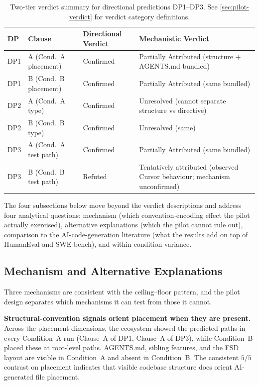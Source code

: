 \documentclass[12pt,a4paper]{report}
\begin{document}
\begin{table}[H]
\centering
\caption{Two-tier verdict summary for directional predictions DP1--DP3. See \autoref{sec:pilot-verdict} for verdict category definitions.}
\label{tab:two-tier-verdicts}
\small
\begin{tabular}{@{}lll p{5.5cm}@{}}
\toprule
\textbf{DP} & \textbf{Clause} & \textbf{Directional Verdict} & \textbf{Mechanistic Verdict} \\
\midrule
DP1 & A (Cond.~A placement) & Confirmed & Partially Attributed (structure + AGENTS.md bundled) \\
DP1 & B (Cond.~B placement) & Confirmed & Partially Attributed (same bundled) \\
DP2 & A (Cond.~A type) & Confirmed & Unresolved (cannot separate structure vs directive) \\
DP2 & B (Cond.~B type) & Confirmed & Unresolved (same) \\
DP3 & A (Cond.~A test path) & Confirmed & Partially Attributed (same bundled) \\
DP3 & B (Cond.~B test path) & Refuted & Tentatively attributed (observed Cursor behaviour; mechanism unconfirmed) \\
\bottomrule
\end{tabular}
\normalsize
\end{table}

The four subsections below move beyond the verdict descriptions and address four analytical questions: mechanism (which convention-encoding effect the pilot actually exercised), alternative explanations (which the pilot cannot rule out), comparison to the AI-code-generation literature (what the results add on top of HumanEval and SWE-bench), and within-condition variance.

\subsection{Mechanism and Alternative Explanations}
\label{sec:mechanism-and-alternatives}

Three mechanisms are consistent with the ceiling--floor pattern, and the pilot design separates which mechanisms it can test from those it cannot.

\textbf{Structural-convention signals orient placement when they are present.} Across the placement dimensions, the ecosystem showed the predicted paths in every Condition~A run (Clause~A of DP1, Clause~A of DP3), while Condition~B placed these at root-level paths. AGENTS.md, sibling features, and the FSD layout are visible in Condition~A and absent in Condition~B. The consistent $5/5$ contrast on placement indicates that visible codebase structure does orient AI-generated file placement.
\end{document}
